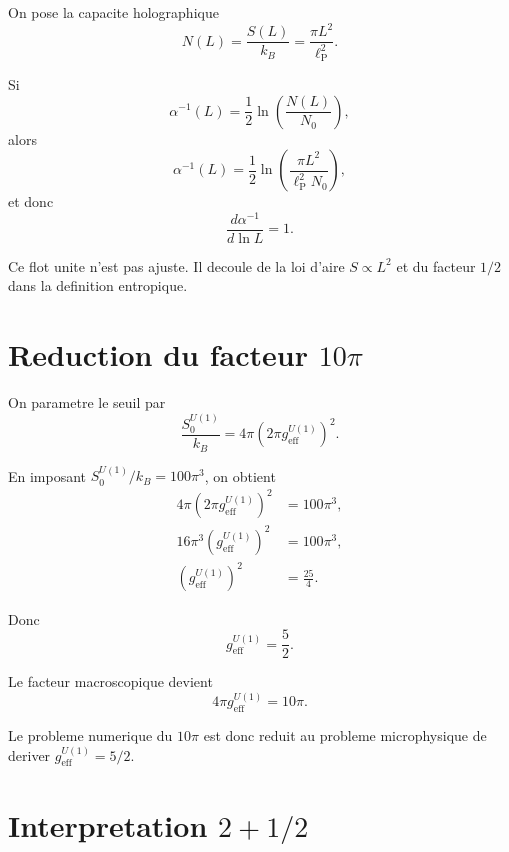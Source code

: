 \documentclass[11pt,a4paper]{article}
\newcommand{\lP}{\ell_{\mathrm P}}
\newcommand{\Seuil}{S_0^{U(1)}}
\newcommand{\geff}{g_{\mathrm{eff}}^{U(1)}}
\begin{document}
On pose la capacite holographique
\begin{equation}
N(L)=\frac{S(L)}{k_B}=\frac{\pi L^2}{\lP^2}.
\end{equation}

Si
\begin{equation}
\alpha^{-1}(L)=\frac12\ln\left(\frac{N(L)}{N_0}\right),
\end{equation}
alors
\begin{equation}
\alpha^{-1}(L)
=\frac12\ln\left(\frac{\pi L^2}{\lP^2N_0}\right),
\end{equation}
et donc
\begin{equation}
\boxed{\frac{d\alpha^{-1}}{d\ln L}=1.}
\label{eq:flow_unit}
\end{equation}

Ce flot unite n'est pas ajuste. Il decoule de la loi d'aire
\(S\propto L^2\) et du facteur \(1/2\) dans la definition entropique.

\section{Reduction du facteur \texorpdfstring{\(10\pi\)}{10 pi}}

On parametre le seuil par
\begin{equation}
\frac{\Seuil}{k_B}=4\pi\left(2\pi\geff\right)^2.
\label{eq:S0_geff}
\end{equation}

En imposant \(\Seuil/k_B=100\pi^3\), on obtient
\begin{align}
4\pi(2\pi \geff)^2&=100\pi^3,\\
16\pi^3(\geff)^2&=100\pi^3,\\
(\geff)^2&=\frac{25}{4}.
\end{align}

Donc
\begin{equation}
\boxed{\geff=\frac52.}
\label{eq:geff_52}
\end{equation}

Le facteur macroscopique devient
\begin{equation}
4\pi\geff=10\pi.
\end{equation}

Le probleme numerique du \(10\pi\) est donc reduit au probleme
microphysique de deriver \(\geff=5/2\).

\section{Interpretation \texorpdfstring{\(2+1/2\)}{2+1/2}}
\end{document}
